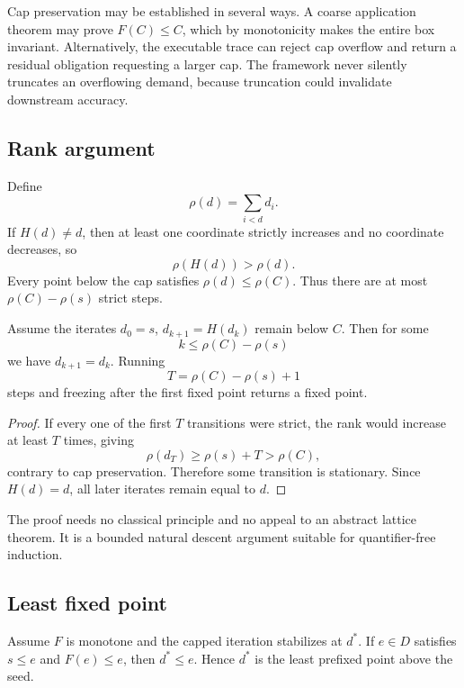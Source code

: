 Cap preservation may be established in several ways.  A coarse application theorem may prove \(F(C)\le C\), which by monotonicity makes the entire box invariant.  Alternatively, the executable trace can reject cap overflow and return a residual obligation requesting a larger cap.  The framework never silently truncates an overflowing demand, because truncation could invalidate downstream accuracy.

\subsection{Rank argument}

Define
\[
 \rho(d)=\sum_{i<d} d_i.
\]
If \(H(d)\ne d\), then at least one coordinate strictly increases and no coordinate decreases, so
\[
 \rho(H(d))>\rho(d).
\]
Every point below the cap satisfies \(\rho(d)\le\rho(C)\).  Thus there are at most \(\rho(C)-\rho(s)\) strict steps.

\begin{theorem}\label{thm:demand-stabilization}
Assume the iterates \(d_0=s\), \(d_{k+1}=H(d_k)\) remain below \(C\).  Then for some
\[
 k\le \rho(C)-\rho(s)
\]
we have \(d_{k+1}=d_k\).  Running
\[
 T=\rho(C)-\rho(s)+1
\]
steps and freezing after the first fixed point returns a fixed point.
\end{theorem}

\begin{proof}
If every one of the first \(T\) transitions were strict, the rank would increase at least \(T\) times, giving
\[
 \rho(d_T)\ge\rho(s)+T>\rho(C),
\]
contrary to cap preservation.  Therefore some transition is stationary.  Since \(H(d)=d\), all later iterates remain equal to \(d\).
\end{proof}

The proof needs no classical principle and no appeal to an abstract lattice theorem.  It is a bounded natural descent argument suitable for quantifier-free induction.

\subsection{Least fixed point}

\begin{theorem}\label{thm:least-demand}
Assume \(F\) is monotone and the capped iteration stabilizes at \(d^*\).  If \(e\in D\) satisfies \(s\le e\) and \(F(e)\le e\), then \(d^*\le e\).  Hence \(d^*\) is the least prefixed point above the seed.
\end{theorem}


